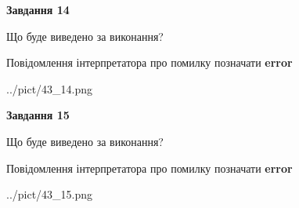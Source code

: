 \documentclass[11pt, ukrainian]{article}
\begin{document}
{\begin {large}
{\begin {center}\textbf{Завдання 14}\end {center}}\par
Що буде виведено за виконання? \par
Повідомлення інтерпретатора про помилку позначати \textbf{error}

\begin{center}
	{../pict/43_14.png}
\end{center}
\newpage

{\begin {center}\textbf{Завдання 15}\end {center}}\par
Що буде виведено за виконання? \par
Повідомлення інтерпретатора про помилку позначати \textbf{error}

\begin{center}
	{../pict/43_15.png}
\end{center}
\newpage

\end {large}}
\end{document}
